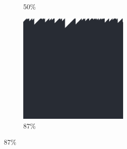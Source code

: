 \documentclass[12pt, fleqn]{report}                             %
\theoremstyle{break}                                            %
\begin{document}
\begin{figure}[ht!]
\begin{subfigure}[b]{0.4\linewidth}
          \caption{50\%}
        \end{subfigure}
        \begin{subfigure}[b]{0.4\linewidth}
          \includegraphics[width=0.6\textwidth]{Images/136/d.png}
          \caption{87\%}
        \end{subfigure}
      \end{figure}
\end{document}
